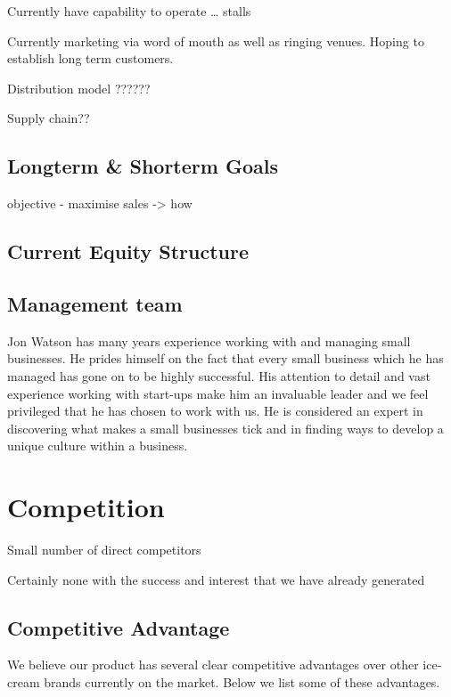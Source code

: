 \documentclass{article}
\begin{document}
Currently have capability to operate … stalls

Currently marketing via word of mouth as well as ringing venues.
Hoping to establish long term customers.

Distribution model ??????

Supply chain??

  \subsection{Longterm \& Shorterm Goals}

    objective - maximise sales -> how


  \subsection{Current Equity Structure}

  \subsection{Management team}

Jon Watson has many years experience working with and managing small
businesses. He prides himself on the fact that every small business which he has managed has gone on to be highly successful. His attention to detail and vast experience working with start-ups make him an invaluable leader and we feel privileged that he has chosen to work with us. He is considered an expert in discovering what makes a small businesses tick and in finding ways to develop a unique culture within a business.


\section{Competition}
  Small number of direct competitors

  Certainly none with the success and interest that we have already
generated


  \subsection{Competitive Advantage}

We believe our product has several clear competitive advantages over
other ice-cream brands currently on the market. Below we list some of these advantages.
\end{document}
